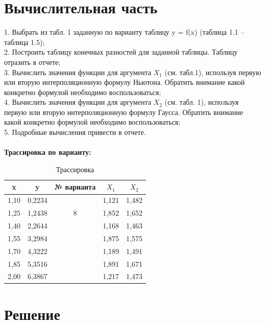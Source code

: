 \documentclass{article}
\begin{document}
\section{Вычислительная часть}
1. Выбрать из табл. 1 заданную по варианту таблицу y = f(x) (таблица 1.1 – таблица 1.5);\\
2. Построить таблицу конечных разностей для заданной таблицы. Таблицу отразить в отчете;\\
3. Вычислить значения функции для аргумента $X_1$ (см. табл.1), используя первую или вторую интерполяционную формулу Ньютона. Обратить внимание какой конкретно формулой необходимо воспользоваться;\\
4. Вычислить значения функции для аргумента $X_2$ (см. табл. 1), используя первую или вторую интерполяционную формулу Гаусса. Обратить внимание какой конкретно формулой необходимо воспользоваться;\\
5. Подробные вычисления привести в отчете.\\ \\
\textbf{Трассировка по варианту:}
\begin{table}[H]
    \centering
    \caption{Трассировка}
    \begin{tabular}{|c|c|c|c|c|}
    \hline
    x & y & № варианта & \( X_1 \) & \( X_2 \) \\ \hline
    1,10 & 0,2234 &  & 1,121 & 1,482 \\ \hline
    1,25 & 1,2438 & 8 & 1,852 & 1,652 \\ \hline
    1,40 & 2,2644 &  & 1,168 & 1,463 \\ \hline
    1,55 & 3,2984 &  & 1,875 & 1,575 \\ \hline
    1,70 & 4,3222 &  & 1,189 & 1,491 \\ \hline
    1,85 & 5,3516 &  & 1,891 & 1,671 \\ \hline
    2,00 & 6,3867 &  & 1,217 & 1,473 \\ \hline
    \end{tabular}
\end{table}
    
\section{Решение}
\end{document}
